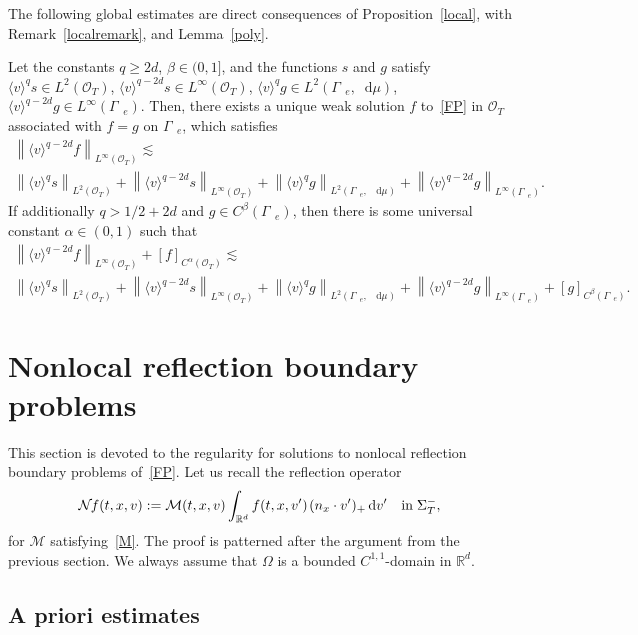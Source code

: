 \documentclass[AHL,Unicode,longabstracts,published]{cedram}
\newcommand*{\dif}{\mathop{}\!\mathrm{d}}
\newcommand*\R {\mathbb{R}}
\newcommand*\M {{\mathcal{M}}}
\newcommand*\NN {{\mathcal{N}\hspace{-.3mm}}}
\newcommand*\Ge {\Gamma_{\;\!\!\;\!\!e}}
\newcommand*\OO {\mathcal{O}}
\newcommand{\lv}{\langle v\rangle}
\begin{document}
The following global estimates are direct consequences of Proposition~\ref{local}, with Remark~\ref{localremark}, and Lemma~\ref{poly}.

\begin{prop}\label{global}
Let the constants $q\ge 2d$, $\beta\in(0,1]$, and the functions $s$ and $g$ satisfy $\lv^qs\in L^2(\OO_T)$, $\lv^{q-2d}s\in L^\infty(\OO_T)$, $\lv^qg\in L^2(\Ge,\dif\mu)$, $\lv^{q-2d}g\in L^\infty(\Ge)$. Then, there exists a unique weak solution $f$ to~\eqref{FP} in $\OO_T$ associated with $f=g$ on $\Ge$, which satisfies
\begin{multline*}
\left\|\lv^{q-2d}f\right\|_{L^\infty(\OO_T)}
\lesssim\\
\left\|\lv^{q}s\right\|_{L^2(\OO_T)} + \left\|\lv^{q-2d}s\right\|_{L^\infty(\OO_T)}
+ \left\|\lv^{q}g\right\|_{L^2(\Ge,\;\!\dif\mu)} + \left\|\lv^{q-2d}g\right\|_{L^\infty(\Ge)}.
\end{multline*}
If additionally $q>1/2+2d$ and $g\in C^\beta(\Ge)$, then there is some universal constant $\alpha\in(0,1)$ such that
\begin{multline*}
\left\|\lv^{q-2d}f\right\|_{L^\infty(\OO_T)} +[f]_{C^\alpha(\OO_T)}
\lesssim\\
\left\|\lv^{q}s\right\|_{L^2(\OO_T)} + \left\|\lv^{q-2d}s\right\|_{L^\infty(\OO_T)}
+\left\|\lv^{q}g\right\|_{L^2(\Ge,\;\!\dif\mu)} + \left\|\lv^{q-2d}g\right\|_{L^\infty(\Ge)} + [g]_{C^\beta(\Ge)}.
\end{multline*}
\end{prop}

\section{Nonlocal reflection boundary problems}\label{diffuse}
This section is devoted to the regularity for solutions to nonlocal reflection boundary problems of~\eqref{FP}. Let us recall the reflection operator
\begin{align*}
\NN f(t,x,v):=\M(t,x,v)\int_{\R^d}f(t,x,v')\;\!(n_x\cdot v')_+\dif v'{\quad\rm in}\;\Sigma_T^-,
\end{align*}
for $\M$ satisfying~\eqref{M}. The proof is patterned after the argument from the previous section. We always assume that $\Omega$ is a bounded $C^{1,1}$-domain in $\R^d$.

\subsection{A priori estimates}
\end{document}
